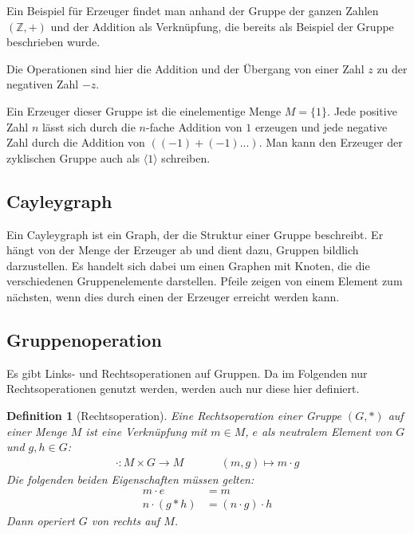 \documentclass[12pt,a4paper, usenames, dvipsnames]{article}
\newtheorem{definition}{Definition}
\begin{document}
Ein Beispiel für Erzeuger findet man anhand der Gruppe der ganzen Zahlen $(\mathbb{Z},+)$ und der Addition als Verknüpfung, die bereits als Beispiel der Gruppe beschrieben wurde.

Die Operationen sind hier die Addition und der Übergang von einer Zahl $z$ zu der negativen Zahl $-z$.

Ein Erzeuger dieser Gruppe ist die einelementige Menge $M = \{ 1 \}$. Jede positive Zahl $n$ lässt sich durch die $n$-fache Addition von $1$ erzeugen und jede negative Zahl durch  die Addition von $((-1)+(-1)...)$. Man kann den Erzeuger der zyklischen Gruppe auch als $\langle 1 \rangle$ schreiben.
%
%
%
%
%
%
%
%
%
\subsection*{Cayleygraph} 
Ein Cayleygraph ist ein Graph, der die Struktur einer Gruppe beschreibt. Er hängt von der Menge der Erzeuger ab und dient dazu, Gruppen bildlich darzustellen.
Es handelt sich dabei um einen Graphen mit Knoten, die die verschiedenen Gruppenelemente darstellen. Pfeile zeigen von einem Element zum nächsten, wenn dies durch einen der Erzeuger erreicht werden kann. \cite{AT}

%
%
%
%
%
%
%
%
%
%

\subsection*{Gruppenoperation} 

Es gibt Links- und Rechtsoperationen auf Gruppen. Da im Folgenden nur Rechtsoperationen genutzt werden, werden auch nur diese hier definiert.

\begin{singlespacing}
\begin{definition}[Rechtsoperation]

Eine Rechtsoperation einer Gruppe $(G, *)$ auf einer Menge $M$ ist eine Verknüpfung mit $m \in M$, $e$ als neutralem Element von $G$ und $g,h \in G$:
\begin{align*}
\cdot: M \times G \rightarrow M \ \ \ \ \ \ \ \ \ \ \ \ \ \ \
(m, g) \mapsto m \cdot g 
\end{align*}
Die folgenden beiden Eigenschaften müssen gelten:
\begin{align*}
m \cdot e & = m \\
n \cdot (g * h) & = (n \cdot g) \cdot h
\end{align*}
Dann operiert $G$ von rechts auf $M$.

\end{definition}
\end{singlespacing}
%
%
%
%
%
%
%
%
%
%
%
%
\end{document}
